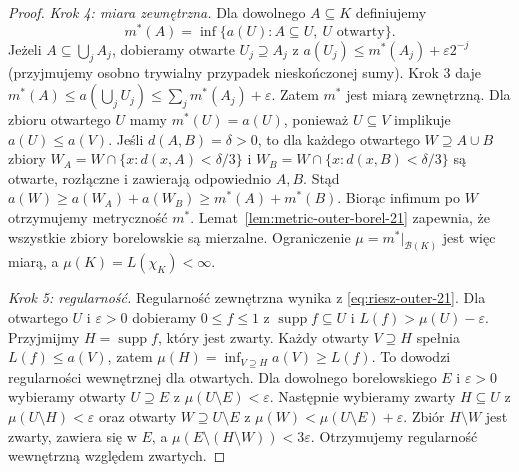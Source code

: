 \documentclass[11pt,a4paper,oneside]{book}
\numberwithin{equation}{chapter}
\theoremstyle{plain}
\theoremstyle{definition}
\theoremstyle{remark}
\begin{document}
\begin{proof}
\emph{Krok 4: miara zewnętrzna.}
Dla dowolnego $A\subseteq K$ definiujemy
\begin{equation}\label{eq:riesz-outer-21}
 m^*(A)=\inf\{a(U):A\subseteq U,\ U\text{ otwarty}\}.
\end{equation}
Jeżeli $A\subseteq\bigcup_j A_j$, dobieramy otwarte
$U_j\supseteq A_j$ z
$a(U_j)\le m^*(A_j)+\varepsilon2^{-j}$ (przyjmujemy
osobno trywialny przypadek nieskończonej sumy).
Krok 3 daje
$m^*(A)\le a(\bigcup_jU_j)\le\sum_jm^*(A_j)+\varepsilon$.
Zatem $m^*$ jest miarą zewnętrzną.
Dla zbioru otwartego $U$ mamy $m^*(U)=a(U)$, ponieważ
$U\subseteq V$ implikuje $a(U)\le a(V)$.
Jeśli $d(A,B)=\delta>0$, to dla każdego otwartego
$W\supseteq A\cup B$ zbiory
$W_A=W\cap\{x:d(x,A)<\delta/3\}$ i
$W_B=W\cap\{x:d(x,B)<\delta/3\}$ są otwarte,
rozłączne i zawierają odpowiednio $A,B$. Stąd
$a(W)\ge a(W_A)+a(W_B)\ge m^*(A)+m^*(B)$.
Biorąc infimum po $W$ otrzymujemy metryczność $m^*$.
Lemat~\ref{lem:metric-outer-borel-21} zapewnia, że
wszystkie zbiory borelowskie są mierzalne. Ograniczenie
$\mu=m^*|_{\mathcal B(K)}$ jest więc miarą, a
$\mu(K)=L(\chi_K)<\infty$.

\emph{Krok 5: regularność.}
Regularność zewnętrzna wynika z \eqref{eq:riesz-outer-21}.
Dla otwartego $U$ i $\varepsilon>0$ dobieramy
$0\le f\le1$ z $\operatorname{supp}f\subseteq U$ i
$L(f)>\mu(U)-\varepsilon$. Przyjmijmy
$H=\operatorname{supp}f$, który jest zwarty.
Każdy otwarty $V\supseteq H$ spełnia
$L(f)\le a(V)$, zatem
$\mu(H)=\inf_{V\supseteq H}a(V)\ge L(f)$.
To dowodzi regularności wewnętrznej dla otwartych.
Dla dowolnego borelowskiego $E$ i $\varepsilon>0$
wybieramy otwarty $U\supseteq E$ z
$\mu(U\setminus E)<\varepsilon$.
Następnie wybieramy zwarty $H\subseteq U$ z
$\mu(U\setminus H)<\varepsilon$ oraz otwarty
$W\supseteq U\setminus E$ z
$\mu(W)<\mu(U\setminus E)+\varepsilon$.
Zbiór $H\setminus W$ jest zwarty, zawiera się w $E$,
a $\mu(E\setminus(H\setminus W))<3\varepsilon$.
Otrzymujemy regularność wewnętrzną względem zwartych.


\end{proof}
\end{document}
